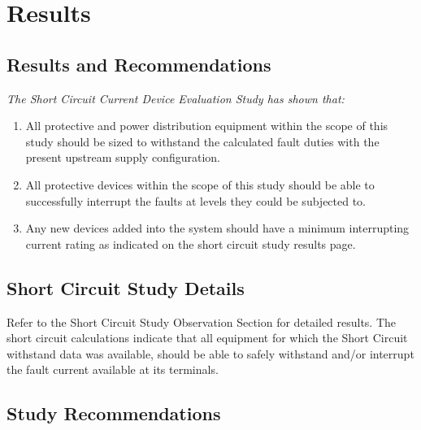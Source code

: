 
\section{Results}
\label{af:results}

\subsection{Results and Recommendations}
\label{af:results:afrr}

\noindent\emph{The Short Circuit Current Device Evaluation Study has shown that:}
\begin{enumerate}
	\item All protective and power distribution equipment within the scope of this study should be sized to withstand the calculated fault duties with the present upstream supply configuration.

	\item All protective devices within the scope of this study should be able to successfully interrupt the faults at levels they could be subjected to.

	\item Any new devices added into the system should have a minimum interrupting current rating as indicated on the short circuit study results page.
\end{enumerate}

\pagebreak

\subsection{Short Circuit Study Details}
\label{af:results:sccd}

\noindent Refer to the Short Circuit Study Observation Section for detailed results.  The short circuit calculations indicate that all equipment for which the Short Circuit withstand data was available, should be able to safely withstand and/or interrupt the fault current available at its terminals.

\pagebreak

\subsection{Study Recommendations}
\label{af:results:afsr}

